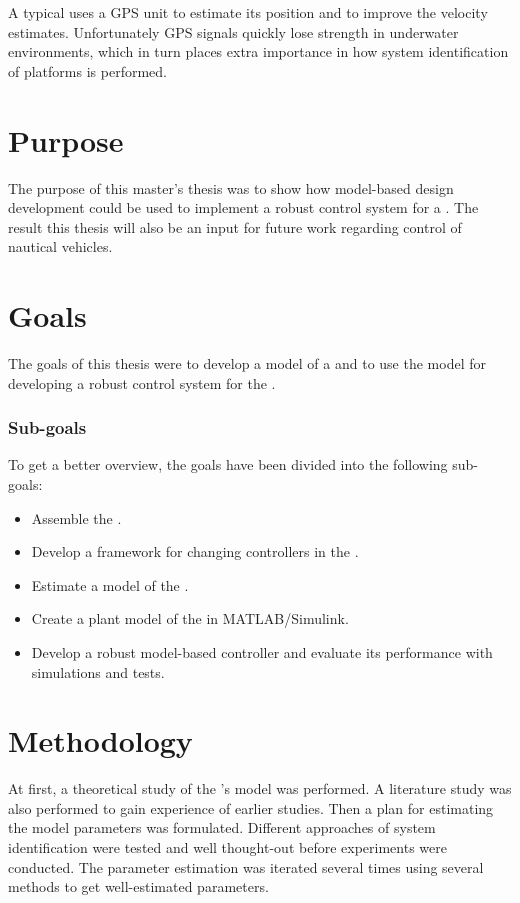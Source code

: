 A typical \abbrUV uses a GPS unit to estimate its position and to improve the velocity estimates. Unfortunately GPS signals quickly lose strength in underwater environments, which in turn places extra importance in how system identification of \abbrROV platforms is performed.


\section{Purpose}
The purpose of this master's thesis was to show how model-based design development could be used to implement a robust control system for a \abbrROV. The result this thesis will also be an input for future work regarding control of nautical vehicles. 


\section{Goals}
The goals of this thesis were to develop a model of a \abbrROV and to use the model for developing a robust control system for the \abbrROV.

\subsubsection{Sub-goals}
To get a better overview, the goals have been divided into the following sub-goals:
\begin{itemize}
    \item Assemble the \abbrROV.
    \item Develop a framework for changing controllers in the \abbrROV.
    \item Estimate a model of the \abbrROV.
    \item Create a plant model of the \abbrROV in MATLAB/Simulink.
    \item Develop a robust model-based controller and evaluate its performance with simulations and tests.
\end{itemize}

\section{Methodology}
At first, a theoretical study of the \abbrROV's model was performed. A literature study was also performed to gain experience of earlier studies. Then a plan for estimating the model parameters was formulated. Different approaches of system identification were tested and well thought-out before experiments were conducted. The parameter estimation was iterated several times using several methods to get well-estimated parameters. 

